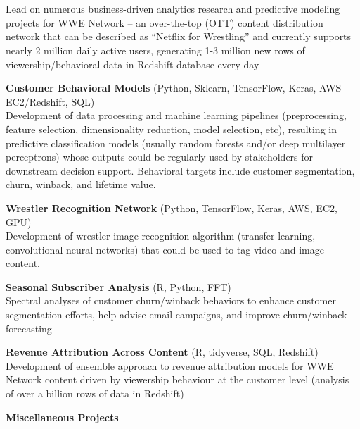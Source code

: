  \\  
 \\
  Lead on numerous business-driven analytics research and
  predictive modeling projects for WWE Network -- an
  over-the-top (OTT) content distribution network  that can be
  described as ``Netflix for Wrestling'' and currently supports nearly
  2 million daily active users, generating 1-3 million new rows of viewership/behavioral 
  data in Redshift database every day
\begin{itemize*}
  \item\leftandright
    {\textbf{Customer Behavioral Models}}
    {\small{(Python, Sklearn, TensorFlow, Keras, AWS
    EC2/Redshift, SQL)}} \\  
    Development of data processing and machine learning pipelines
    (preprocessing, feature selection, dimensionality reduction,
    model selection, etc), resulting in predictive classification
    models (usually random forests and/or deep multilayer perceptrons) 
    whose outputs could be regularly used by stakeholders for
    downstream decision support.  Behavioral targets include
    customer segmentation, churn, winback, and lifetime value.        
  \item\leftandright
    {\textbf{Wrestler Recognition Network}}
    {\small{(Python, TensorFlow, Keras, AWS, EC2, GPU)}} \\  
    Development of wrestler image recognition algorithm (transfer learning,
    convolutional neural networks) that could be used to tag video
    and image content.
  \item\leftandright
    {\textbf{Seasonal Subscriber Analysis}}
    {\small{(R, Python, FFT)}} \\  
    Spectral analyses of customer churn/winback behaviors 
    to enhance customer segmentation efforts, help advise email campaigns, and
    improve churn/winback forecasting 
  \item\leftandright
    {\textbf{Revenue Attribution Across Content}}
    {\small{(R, tidyverse, SQL, Redshift)}} \\  
    Development of ensemble approach to revenue attribution models for WWE Network content
    driven by viewership behaviour at the customer level (analysis of
    over a billion rows of data in Redshift)
  \item\leftandright
    {\textbf{Miscellaneous Projects}}

\end{itemize*}
